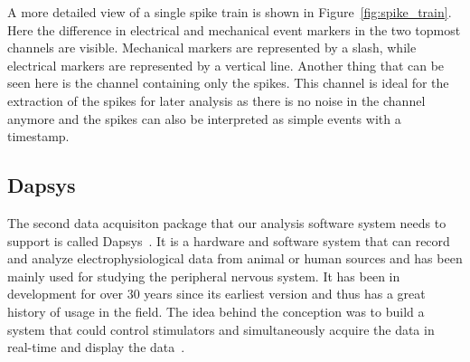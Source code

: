 A more detailed view of a single spike train is shown in Figure~\ref{fig:spike_train}. Here the difference in electrical and mechanical event markers in the two topmost channels are visible. Mechanical markers are represented by a slash, while electrical markers are represented by a vertical line. Another thing that can be seen here is the channel containing only the spikes. This channel is ideal for the extraction of the spikes for later analysis as there is no noise in the channel anymore and the spikes can also be interpreted as simple events with a timestamp.

\subsection{Dapsys}

The second data acquisiton package that our analysis software system needs to support is called Dapsys~\cite{dapsys}. It is a hardware and software system that can record and analyze electrophysiological data from animal or human sources and has been mainly used for studying the peripheral nervous system. It has been in development for over 30 years since its earliest version and thus has a great history of usage in the field. The idea behind the conception was to build a system that could control stimulators and simultaneously acquire the data in real-time and display the data~\cite{dapsysArticle}.

